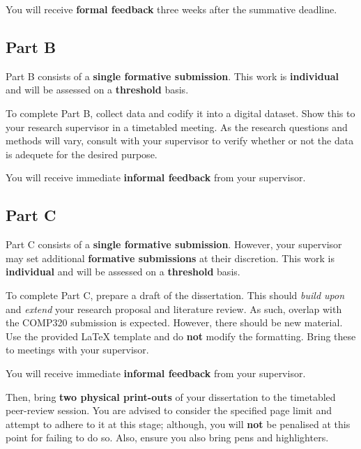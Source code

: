 You will receive \textbf{formal feedback} three weeks after the summative deadline.

\subsection*{Part B}

Part B consists of a \textbf{single formative submission}.
This work is \textbf{individual} and will be assessed on a \textbf{threshold} basis.

To complete Part B, collect data and codify it into a digital dataset. Show this to your research supervisor in a timetabled meeting. 
As the research questions and methods will vary, consult with your supervisor to verify whether or not the
data is adequete for the desired purpose.

You will receive immediate \textbf{informal feedback} from your supervisor.


\subsection*{Part C}

Part C consists of a \textbf{single formative submission}. 
However, your supervisor may set additional \textbf{formative submissions} at their discretion.
This work is \textbf{individual} and will be assessed on a \textbf{threshold} basis.

To complete Part C, prepare a draft of the dissertation. This should \textit{build upon} and \textit{extend} your research proposal and
literature review. As such, overlap with the COMP320 submission is expected. However, there should be new material.
Use the provided LaTeX template and do \textbf{not} modify the formatting. Bring these to meetings with your supervisor.

You will receive immediate \textbf{informal feedback} from your supervisor.

Then, bring \textbf{two physical print-outs} of your dissertation to the timetabled peer-review session. 
You are advised to consider the specified page limit and attempt to adhere to it at this stage; although, you will \textbf{not} be penalised at this point for failing to do so.  Also, ensure you also bring pens and highlighters.

